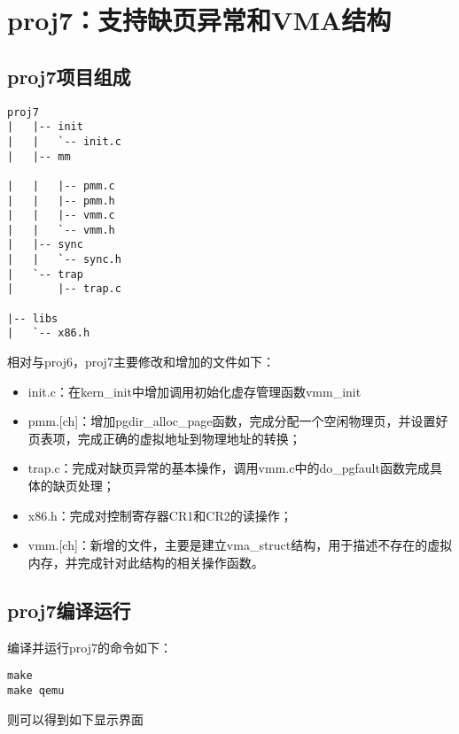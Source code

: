 \section{proj7：支持缺页异常和VMA结构}\label{proj7ux652fux6301ux7f3aux9875ux5f02ux5e38ux548cvmaux7ed3ux6784}

\subsection{proj7项目组成}\label{proj7ux9879ux76eeux7ec4ux6210}

\begin{lstlisting}
proj7
|   |-- init
|   |   `-- init.c   
|   |-- mm

|   |   |-- pmm.c
|   |   |-- pmm.h
|   |   |-- vmm.c
|   |   `-- vmm.h
|   |-- sync
|   |   `-- sync.h
|   `-- trap
|       |-- trap.c

|-- libs
|   `-- x86.h
\end{lstlisting}

相对与proj6，proj7主要修改和增加的文件如下：

\begin{itemize}
\item
  init.c：在kern\_init中增加调用初始化虚存管理函数vmm\_init
\item
  pmm.{[}ch{]}：增加pgdir\_alloc\_page函数，完成分配一个空闲物理页，并设置好页表项，完成正确的虚拟地址到物理地址的转换；
\item
  trap.c：完成对缺页异常的基本操作，调用vmm.c中的do\_pgfault函数完成具体的缺页处理；
\item
  x86.h：完成对控制寄存器CR1和CR2的读操作；
\item
  vmm.{[}ch{]}：新增的文件，主要是建立vma\_struct结构，用于描述不存在的虚拟内存，并完成针对此结构的相关操作函数。
\end{itemize}

\subsection{proj7编译运行}\label{proj7ux7f16ux8bd1ux8fd0ux884c}

编译并运行proj7的命令如下：

\begin{lstlisting}
make
make qemu
\end{lstlisting}

则可以得到如下显示界面

